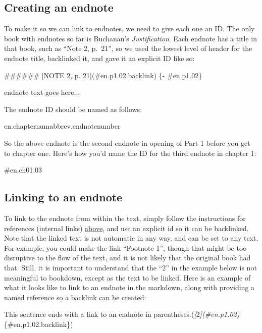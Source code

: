 \documentclass[
]{book}
\newenvironment{Shaded}{\begin{snugshade}}{\end{snugshade}}
\newcommand{\CommentTok}[1]{\textcolor[rgb]{0.56,0.35,0.01}{\textit{#1}}}
\newcommand{\FunctionTok}[1]{\textcolor[rgb]{0.00,0.00,0.00}{#1}}
\newcommand{\NormalTok}[1]{#1}
\newcommand{\OtherTok}[1]{\textcolor[rgb]{0.56,0.35,0.01}{#1}}
\begin{document}
\hypertarget{creating-an-endnote}{%
\subsection{Creating an endnote}\label{creating-an-endnote}}

To make it so we can link to endnotes, we need to give each one an ID. The only book with endnotes so far is Buchanan's \emph{Justification}. Each endnote has a title in that book, such as ``Note 2, p.~21'', so we used the lowest level of header for the endnote title, backlinked it, and gave it an explicit ID like so:

\begin{Shaded}
\begin{Highlighting}[]
\FunctionTok{\#\#\#\#\#\# [NOTE 2, p. 21](\#en.p1.02.backlink) \{{-} \#en.p1.02\}}

\NormalTok{endnote text goes here...}
\end{Highlighting}
\end{Shaded}

The endnote ID should be named as follows:

en.chapternumabbrev.endnotenumber

So the above endnote is the second endnote in opening of Part 1 before you get to chapter one. Here's how you'd name the ID for the third endnote in chapter 1:

\#en.ch01.03

\hypertarget{linking-to-an-endnote}{%
\subsection{Linking to an endnote}\label{linking-to-an-endnote}}

To link to the endnote from within the text, simply follow the instructions for references (internal links) \protect\hyperlink{references}{above}, and use an explicit id so it can be backlinked. Note that the linked text is not automatic in any way, and can be set to any text. For example, you could make the link ``Footnote 1'', though that might be too disruptive to the flow of the text, and it is not likely that the original book had that. Still, it is important to understand that the ``2'' in the example below is not meaningful to bookdown, except as the text to be linked. Here is an example of what it looks like to link to an endnote in the markdown, along with providing a named reference so a backlink can be created:

\begin{Shaded}
\begin{Highlighting}[]
\NormalTok{This sentence ends with a link to an endnote in parentheses.(}\CommentTok{[}\OtherTok{2}\CommentTok{](\#en.p1.02)}\NormalTok{\{\#en.p1.02.backlink\})}
\end{Highlighting}
\end{Shaded}
\end{document}
